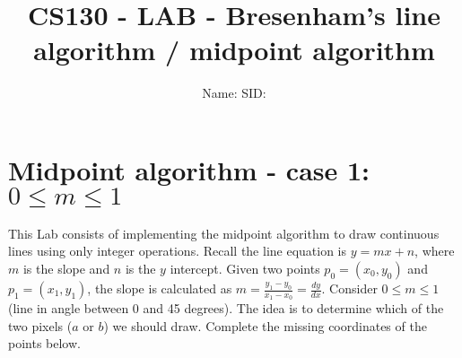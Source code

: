 \documentclass[12pt]{article}
\newcommand{\TODOL}[1]{\textcolor{red}{\underline{\hspace{#1 cm}}}}
\begin{document}
\title{CS130 - LAB - Bresenham's line algorithm / midpoint algorithm}
\date{}
\author{Name: \TODOL7\qquad\qquad SID: \TODOL4}
\maketitle
\begin{center}
\end{center}

\section{Midpoint algorithm - case 1: $0 \le m \le 1$}

This Lab consists of implementing the midpoint algorithm to draw continuous
lines using only integer operations. Recall the line equation is $y = mx + n$,
where $m$ is the slope and $n$ is the $y$ intercept.  Given two points $p_0 =
(x_0, y_0)$ and $p_1 = (x_1, y_1)$, the slope is calculated as $m = \frac{y_1 -
  y_0}{x_1 - x_0} = \frac{dy}{dx}$.  Consider $0 \le m \le 1$ (line in angle
between 0 and 45 degrees).  The idea is to determine which of the two pixels
($a$ or $b$) we should draw. Complete the missing coordinates of the points
below.\\
\begin{center}
\end{center}
\end{document}

